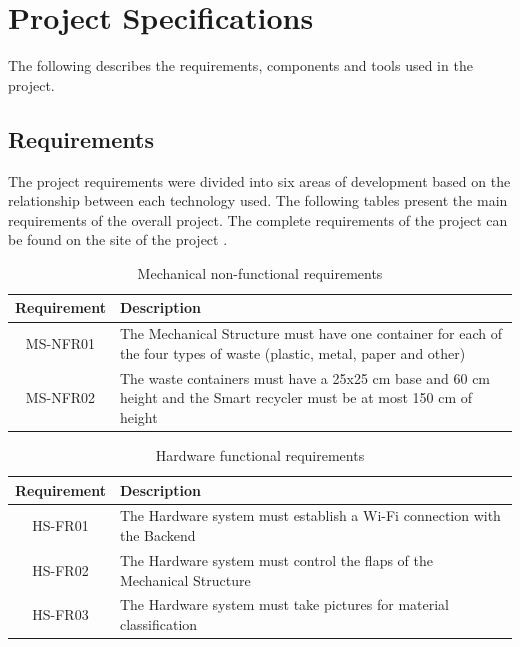 \documentclass[a4paper,11pt]{article}
\begin{document}
\section{Project Specifications}
\label{sec:specification}
\noindent

The following describes the requirements, components and tools used in the project.

\subsection{Requirements}
\label{subsec:requirement}

The project requirements were divided into six areas of development based on the relationship between each technology used. The following tables present the main requirements of the overall project. The complete requirements of the project can be found on the site of the project \cite{blog}.

\begin{table}[H]
  \caption{\small{Mechanical non-functional requirements}}
  \begin{center}
    \begin{tabular}{|c|p{95mm}|}
      \hline
      Requirement & Description                                                                                                             \\ \hline
      MS-NFR01    & The Mechanical Structure must have one container for each of the four types of waste (plastic, metal, paper and other)  \\ \hline
      MS-NFR02    & The waste containers must have a 25x25 cm base and 60 cm height and the Smart recycler must be at most 150 cm of height \\ \hline
    \end{tabular}
  \end{center}
  \label{tab:mechanical1}
\end{table}

\begin{table}[H]
  \caption{\small{Hardware functional requirements}}
  \begin{center}
    \begin{tabular}{|c|p{95mm}|}
      \hline
      Requirement & Description                                                            \\ \hline
      HS-FR01     & The Hardware system must establish a Wi-Fi connection with the Backend \\ \hline
      HS-FR02     & The Hardware system must control the flaps of the Mechanical Structure \\ \hline
      HS-FR03     & The Hardware system must take pictures for material classification     \\ \hline
    \end{tabular}
  \end{center}
  \label{tab:hardware0}
\end{table}
\end{document}
